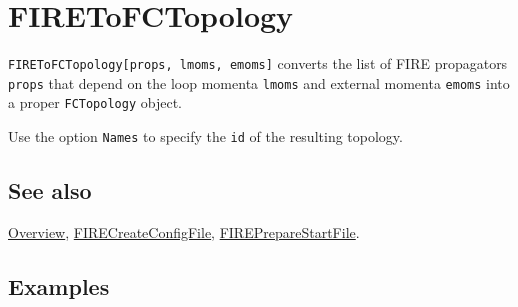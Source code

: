 \documentclass[../FeynHelpersManual.tex]{subfiles}
\begin{document}
\hypertarget{firetofctopology}{
\section{FIREToFCTopology}\label{firetofctopology}}

\texttt{FIREToFCTopology[\allowbreak{}props,\ \allowbreak{}lmoms,\ \allowbreak{}emoms]}
converts the list of FIRE propagators \texttt{props} that depend on the
loop momenta \texttt{lmoms} and external momenta \texttt{emoms} into a
proper \texttt{FCTopology} object.

Use the option \texttt{Names} to specify the \texttt{id} of the
resulting topology.

\subsection{See also}

\hyperlink{toc}{Overview},
\hyperlink{firecreateconfigfile}{FIRECreateConfigFile},
\hyperlink{firepreparestartfile}{FIREPrepareStartFile}.

\subsection{Examples}

\begin{Shaded}
\begin{Highlighting}[]
\ExtensionTok{=} \OperatorTok{\{}\SpecialCharTok{\^{}}\OperatorTok{,}\SpecialCharTok{\^{}}\OperatorTok{,}\SpecialCharTok{\^{}}\OperatorTok{,}\NormalTok{ (} \SpecialCharTok{{-}}\SpecialCharTok{{-}}\SpecialCharTok{{-}}\SpecialCharTok{\^{}}\OperatorTok{,}\NormalTok{ (} \SpecialCharTok{{-}}\SpecialCharTok{{-}}\SpecialCharTok{\^{}}\OperatorTok{,}\NormalTok{ (} \SpecialCharTok{{-}}\SpecialCharTok{\^{}}\OperatorTok{,}\NormalTok{ (} \SpecialCharTok{{-}}\SpecialCharTok{\^{}}\OperatorTok{,}\SpecialCharTok{+}\SpecialCharTok{\^{}}\OperatorTok{,}\SpecialCharTok{+}\SpecialCharTok{\^{}}\OperatorTok{\}}
\end{Highlighting}
\end{Shaded}
\end{document}
